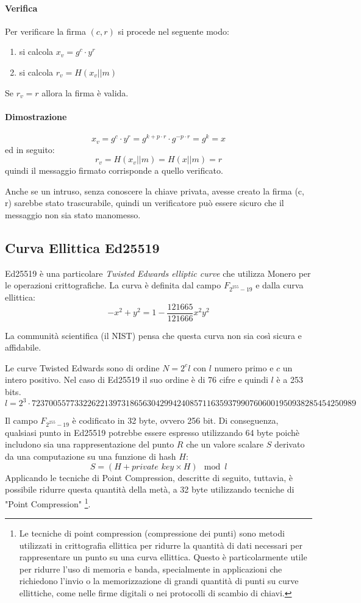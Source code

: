 \documentclass[12pt,a4paper]{article}
\begin{document}
\paragraph{Verifica}
Per verificare la firma $ (c, r) $ si procede nel seguente modo:
\begin{enumerate}
    \item si calcola $ x_v = g^c\cdot y^r $
    \item si calcola $ r_v = H(x_v || m) $
\end{enumerate}
Se $ r_v = r $ allora la firma è valida.

\paragraph{Dimostrazione}
$$ x_v = g^c\cdot y^r = g^{k + p\cdot r}\cdot g^{-p\cdot r} = g^k = x $$ ed in
seguito:
$$ r_v = H(x_v || m) = H(x || m) = r $$ quindi il messaggio firmato corrisponde
a quello verificato.

Anche se un intruso, senza conoscere la chiave privata, avesse creato la firma
(c, r) sarebbe stato trascurabile, quindi un verificatore può essere sicuro che
il messaggio non sia stato manomesso.

\subsection{Curva Ellittica Ed25519}
Ed25519 è una particolare \textit{Twisted Edwards elliptic curve} che utilizza
Monero per le operazioni crittografiche. La curva è definita dal campo $
F_{2^{255} - 19} $ e dalla curva ellittica:
$$ -x^2 + y^2 = 1 - \frac{121665}{121666}x^2y^2 $$

La communità scientifica (il NIST) pensa che questa curva non sia così sicura e
affidabile. 

Le curve Twisted Edwards sono di ordine $ N = 2^c l $ con $ l $ numero primo e $
c $ un intero positivo. Nel caso di Ed25519 il suo ordine è di 76 cifre e quindi
$ l $ è a 253 bits.
$$ l = 2^3 \cdot
7237005577332262213973186563042994240857116359379907606001950938285454250989 $$

Il campo $ F_{2^{255} - 19} $ è codificato in 32 byte, ovvero 256 bit. Di
conseguenza, qualsiasi punto in Ed25519 potrebbe essere espresso utilizzando 64
byte poichè includono sia una rappresentazione del punto $ R $ che un valore
scalare $ S $ derivato da una computazione su una funzione di hash $ H $:
$$ S = (H + \textit{private key} \times H) \mod l $$ Applicando le tecniche di
Point Compression, descritte di seguito, tuttavia, è possibile ridurre questa
quantità della metà, a 32 byte utilizzando tecniche di "Point Compression"
\footnote{Le tecniche di point compression (compressione dei punti) sono metodi
utilizzati in crittografia ellittica per ridurre la quantità di dati necessari
per rappresentare un punto su una curva ellittica. Questo è particolarmente
utile per ridurre l'uso di memoria e banda, specialmente in applicazioni che
richiedono l'invio o la memorizzazione di grandi quantità di punti su curve
ellittiche, come nelle firme digitali o nei protocolli di scambio di chiavi.}.
\end{document}
